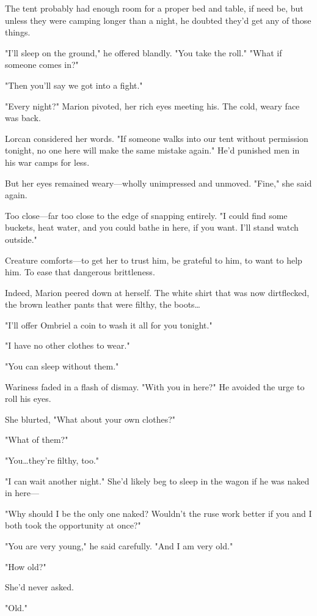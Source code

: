 The tent probably had enough room for a proper bed and table, if need be, but unless they were camping longer than a night, he doubted they'd get any of those things.

"I'll sleep on the ground," he offered blandly.
"You take the roll."
"What if someone comes in?"

"Then you'll say we got into a fight."

"Every night?"
Marion pivoted, her rich eyes meeting his.
The cold, weary face was back.

Lorcan considered her words.
"If someone walks into our tent without permission tonight, no one here will make the same mistake again."
He'd punished men in his war camps for less.

But her eyes remained weary---wholly unimpressed and unmoved.
"Fine," she said again.

Too close---far too close to the edge of snapping entirely.
"I could find some buckets, heat water, and you could bathe in here, if you want.
I'll stand watch outside."

Creature comforts---to get her to trust him, be grateful to him, to want to help him.
To ease that dangerous brittleness.

Indeed, Marion peered down at herself.
The white shirt that was now dirtflecked, the brown leather pants that were filthy, the boots\ldots{}

"I'll offer Ombriel a coin to wash it all for you tonight."

"I have no other clothes to wear."

"You can sleep without them."

Wariness faded in a flash of dismay.
"With you in here?"
He avoided the urge to roll his eyes.

She blurted, "What about your own clothes?"

"What of them?"

"You\ldots they're filthy, too."

"I can wait another night."
She'd likely beg to sleep in the wagon if he was naked in here---

"Why should I be the only one naked?
Wouldn't the ruse work better if you and I both took the opportunity at once?"

"You are very young," he said carefully.
"And I am very old."

"How old?"

She'd never asked.

"Old."

